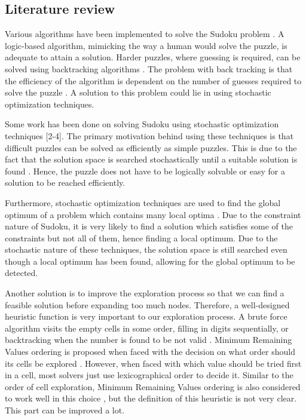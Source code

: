 \documentclass[12pt]{article}
\begin{document}
\begin{spacing}{1.1}
\section{Literature review}

Various algorithms have been implemented to solve the Sudoku problem \cite{sspr}. A logic-based algorithm, mimicking the way a human would solve the puzzle, is adequate to attain a solution. Harder puzzles, where guessing is required, can be solved using backtracking algorithms \cite{sspr}. The problem with back tracking is that the efficiency of the algorithm is dependent on the number of guesses required to solve the puzzle \cite{tj}. A solution to this problem could lie in using stochastic optimization techniques.

Some work has been done on solving Sudoku using stochastic optimization techniques [2-4]. The primary motivation behind using these techniques is that difficult puzzles can be solved as efficiently as simple puzzles. This is due to the fact that the solution space is searched stochastically until a suitable solution is found \cite{tj}. Hence, the puzzle does not have to be logically solvable or easy for a solution to be reached efficiently.

Furthermore, stochastic optimization techniques are used to find the global optimum of a problem which contains many local optima \cite{aj}. Due to the constraint nature of Sudoku, it is very likely to find a solution which satisfies some of the constraints but not all of them, hence finding a local optimum. Due to the stochastic nature of these techniques, the solution space is still searched even though a local optimum has been found, allowing for the global optimum to be detected.

Another solution is to improve the exploration process so that we can find a feasible solution before expanding too much nodes. Therefore, a well-designed heuristic function is very important to our exploration process. A brute force algorithm visits the empty cells in some order, filling in digits sequentially, or backtracking when the number is found to be not valid \cite{bt}. Minimum Remaining Values ordering is proposed when faced with the decision on what order should its cells be explored \cite{rl}. However, when faced with which value should be tried first in a cell, most solvers just use lexicographical order to decide it. Similar to the order of cell exploration, Minimum Remaining Values ordering is also considered to work well in this choice \cite{rl}, but the definition of this heuristic is not very clear. This part can be improved a lot.


\end{spacing}
\end{document}
